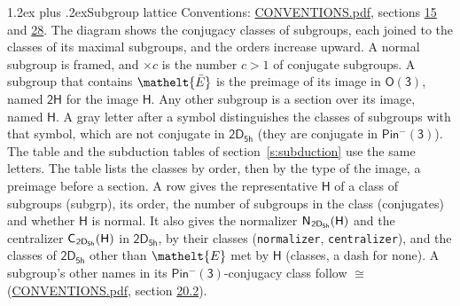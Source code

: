 \documentclass[10pt,a4paper]{article}
\makeatletter
\renewcommand\section{\@startsection{section}{1}{\z@}{-3ex plus -1ex minus -.2ex}%
  {1.2ex plus .2ex}{\normalfont\large\sffamily\bfseries\color{parttitle}}}
\numberwithin{equation}{section}
\newcommand{\eltfont}[1]{{\let\sigma\eltsigma\mathelt{#1}}}
\newcommand{\grp}[1]{\mathsf{#1}}
\newcommand{\cls}[1]{\eltfont{#1}}
\newcommand{\elt}[1]{\eltfont{#1}}
\newcommand{\samecls}{\cong}
\newcommand{\barred}[1]{\bar{#1}}
\newcommand{\hairsp}{\mkern1mu}
\makeatother
\begin{document}
\section{Subgroup lattice}\label{s:subgroups}
Conventions: \href{../../CONVENTIONS.pdf}{CONVENTIONS.pdf}, sections \href{../../../rotation/CONVENTIONS.pdf\#conv.15}{15} and \href{../../CONVENTIONS.pdf\#conv.28}{28}.
The diagram shows the conjugacy classes of subgroups, each joined to the classes of its maximal subgroups, and the orders increase upward. A normal subgroup is framed, and ${\times}c$ is the number $c > 1$ of conjugate subgroups. \label{n:group.H}A subgroup that contains $\elt{\barred{E}}$ is the preimage of its image in $\grp{O(3)}$, named $\grp{2H}$ for the image $\grp{H}$. Any other subgroup is a section over its image, named $\grp{H}$. \label{n:mark.letter}A gray letter after a symbol distinguishes the classes of subgroups with that symbol, which are not conjugate in $\grp{2D_{5h}}$ (they are conjugate in \href{Pinminus3.pdf}{$\grp{Pin^{-}(3)}$}). The table and the subduction tables of section~\ref{s:subduction} use the same letters. The table lists the classes by order, then by the type of the image, a preimage before a section. \label{n:head.subgroup}\label{n:head.order}\label{n:head.conjugates}\label{n:head.normal}A row gives the representative $\grp{H}$ of a class of subgroups (subgrp), its order, the number of subgroups in the class (conjugates) and whether $\grp{H}$ is normal. \label{n:group.normalizer}\label{n:group.centralizer}\label{n:head.classes}It also gives the normalizer $\grp{N}_{\hairsp \grp{2D_{5h}}}(\grp{H})$ and the centralizer $\grp{C}_{\hairsp \grp{2D_{5h}}}(\grp{H})$ in $\grp{2D_{5h}}$, by their classes (\texttt{normalizer}, \texttt{centralizer}), and the classes of $\grp{2D_{5h}}$ other than $\cls{E}$ met by $\grp{H}$ (classes, a dash for none). A subgroup's other names in its \href{Pinminus3.pdf}{$\grp{Pin^{-}(3)}$}-conjugacy class follow $\samecls$ (\href{../../CONVENTIONS.pdf}{CONVENTIONS.pdf}, section \href{../../CONVENTIONS.pdf\#conv.20.2}{20.2}).
\end{document}
